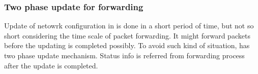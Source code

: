 \documentclass[a4paper,11pt,openany,oneside,english]{sphinxmanual}
\begin{document}
\subsubsection{Two phase update for forwarding}
\label{\detokenize{design/impl/spp_vf:two-phase-update-for-forwarding}}
Update of netowrk configuration in  is done in a short period of
time, but not so short considering the time scale of packet forwarding.
It might forward packets before the updating is completed possibly.
To avoid such kind of situation,  has two phase update mechanism.
Status info is referred from forwarding process after the update is completed.

\begin{sphinxVerbatim}[commandchars=\\\{\},formatcom=\footnotesize]
     
     
      
      

        

      
       
         


       

     
\end{sphinxVerbatim}
\end{document}
